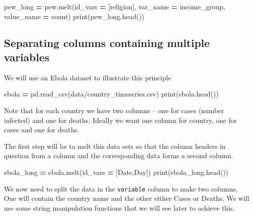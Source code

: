 \documentclass[
  letterpaper,
]{scrbook}
\newenvironment{Shaded}{\begin{snugshade}}{\end{snugshade}}
\newcommand{\BuiltInTok}[1]{#1}
\newcommand{\NormalTok}[1]{#1}
\newcommand{\OperatorTok}[1]{\textcolor[rgb]{0.81,0.36,0.00}{\textbf{#1}}}
\newcommand{\StringTok}[1]{\textcolor[rgb]{0.31,0.60,0.02}{#1}}
\begin{document}
\begin{Shaded}
\begin{Highlighting}[]
\NormalTok{pew\_long }\OperatorTok{=}\NormalTok{ pew.melt(id\_vars }\OperatorTok{=}\NormalTok{ [}\StringTok{\textquotesingle{}religion\textquotesingle{}}\NormalTok{], var\_name }\OperatorTok{=} \StringTok{\textquotesingle{}income\_group\textquotesingle{}}\NormalTok{, value\_name }\OperatorTok{=} \StringTok{\textquotesingle{}count\textquotesingle{}}\NormalTok{)}
\BuiltInTok{print}\NormalTok{(pew\_long.head())}
\end{Highlighting}
\end{Shaded}

\hypertarget{separating-columns-containing-multiple-variables}{%
\subsection{Separating columns containing multiple variables}\label{separating-columns-containing-multiple-variables}}

We will use an Ebola dataset to illustrate this principle

\begin{Shaded}
\begin{Highlighting}[]
\NormalTok{ebola }\OperatorTok{=}\NormalTok{ pd.read\_csv(}\StringTok{\textquotesingle{}data/country\_timeseries.csv\textquotesingle{}}\NormalTok{)}
\BuiltInTok{print}\NormalTok{(ebola.head())}
\end{Highlighting}
\end{Shaded}

Note that for each country we have two columns -- one for cases (number infected) and one for deaths. Ideally we want one column for country, one for cases and one for deaths.

The first step will be to melt this data sets so that the column headers in question from a column and the corresponding data forms a second column.

\begin{Shaded}
\begin{Highlighting}[]
\NormalTok{ebola\_long }\OperatorTok{=}\NormalTok{ ebola.melt(id\_vars }\OperatorTok{=}\NormalTok{ [}\StringTok{\textquotesingle{}Date\textquotesingle{}}\NormalTok{,}\StringTok{\textquotesingle{}Day\textquotesingle{}}\NormalTok{])}
\BuiltInTok{print}\NormalTok{(ebola\_long.head())}
\end{Highlighting}
\end{Shaded}

We now need to split the data in the \texttt{variable} column to make two columns. One will contain the country name and the other either Cases or Deaths. We will use some string manipulation functions that we will see later to achieve this.
\end{document}
